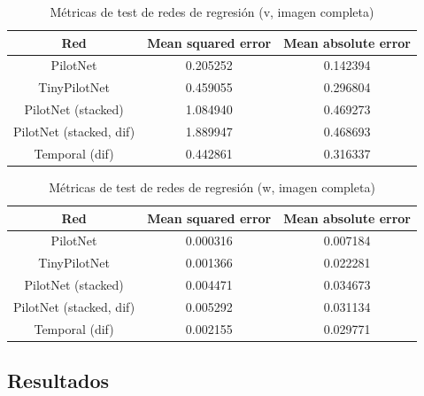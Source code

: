 \begin{table}[H]
\centering
\caption{Métricas de test de redes de regresión (v, imagen completa)}
\label{metricas_regresion_completa_v}
\begin{tabular}{c|c|c|}
\cline{1-3}
                        \multicolumn{1}{|c|}{Red}    & Mean squared error       & Mean absolute error             \\ \hline
\multicolumn{1}{|c|}{PilotNet}    & 0.205252    & 0.142394    \\ \hline
\multicolumn{1}{|c|}{TinyPilotNet}     & 0.459055      & 0.296804   \\ \hline
\multicolumn{1}{|c|}{PilotNet (stacked)}   & 1.084940    & 0.469273  \\ \hline
\multicolumn{1}{|c|}{PilotNet (stacked, dif)}     & 1.889947    & 0.468693        \\ \hline
\multicolumn{1}{|c|}{Temporal (dif)}      & 0.442861     & 0.316337   \\ \hline
\end{tabular}
\end{table}

\begin{table}[H]
\centering
\caption{Métricas de test de redes de regresión (w, imagen completa)}
\label{metricas_regresion_completa_w}
\begin{tabular}{c|c|c|}
\cline{1-3}
                        \multicolumn{1}{|c|}{Red}    & Mean squared error       & Mean absolute error             \\ \hline
\multicolumn{1}{|c|}{PilotNet}    & 0.000316   & 0.007184    \\ \hline
\multicolumn{1}{|c|}{TinyPilotNet}     & 0.001366      & 0.022281   \\ \hline
\multicolumn{1}{|c|}{PilotNet (stacked)}   & 0.004471    & 0.034673   \\ \hline
\multicolumn{1}{|c|}{PilotNet (stacked, dif)}     & 0.005292    & 0.031134        \\ \hline
\multicolumn{1}{|c|}{Temporal (dif)}      & 0.002155     & 0.029771   \\ \hline
\end{tabular}
\end{table}




\subsection{Resultados}

